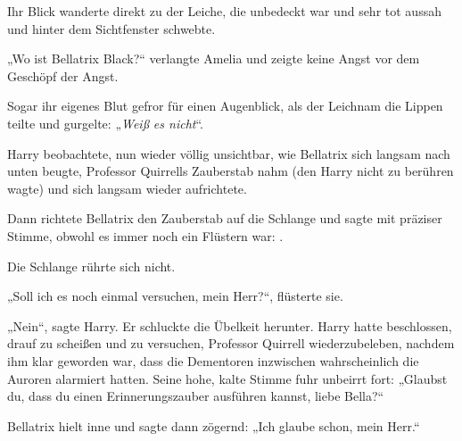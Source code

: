 Ihr Blick wanderte direkt zu der Leiche, die unbedeckt war und sehr tot aussah und hinter dem Sichtfenster schwebte.

„Wo ist Bellatrix Black?“ verlangte Amelia und zeigte keine Angst vor dem Geschöpf der Angst.

Sogar ihr eigenes Blut gefror für einen Augenblick, als der Leichnam die Lippen teilte und gurgelte: „\emph{Weiß} \emph{es nicht}“.

\later

Harry beobachtete, nun wieder völlig unsichtbar, wie Bellatrix sich langsam nach unten beugte, Professor Quirrells Zauberstab nahm (den Harry nicht zu berühren wagte) und sich langsam wieder aufrichtete.

Dann richtete Bellatrix den Zauberstab auf die Schlange und sagte mit präziser Stimme, obwohl es immer noch ein Flüstern war: .

Die Schlange rührte sich nicht.

„Soll ich es noch einmal versuchen, mein Herr?“, flüsterte sie.

„Nein“, sagte Harry. Er schluckte die Übelkeit herunter. Harry hatte beschlossen, drauf zu scheißen und zu versuchen, Professor Quirrell wiederzubeleben, nachdem ihm klar geworden war, dass die Dementoren inzwischen wahrscheinlich die Auroren alarmiert hatten. Seine hohe, kalte Stimme fuhr unbeirrt fort:
„Glaubst du, dass du einen Erinnerungszauber ausführen kannst, liebe Bella?“

Bellatrix hielt inne und sagte dann zögernd:
„Ich glaube schon, mein Herr.“

